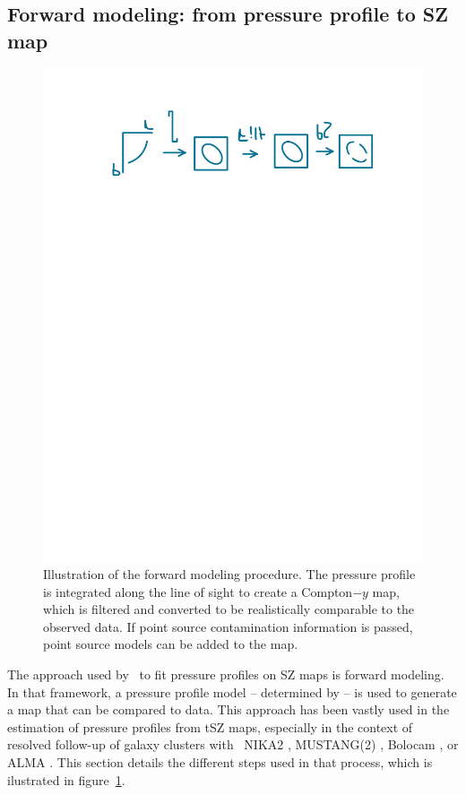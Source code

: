 \subsection{Forward modeling: from pressure profile to SZ map} \label{sec:algo:fwdmod}

\begin{figure}
    \centering
    \includegraphics[width=.9\linewidth]{Figures/fwdmod_placeholder.pdf}
    \caption{
        Illustration of the forward modeling procedure.
        The pressure profile is integrated along the line of sight to create a Compton$-y$ map, which is filtered and converted to be realistically comparable to the observed data.
        If point source contamination information is passed, point source models can be added to the map.
    }
    \label{fig:fwmod}
\end{figure}

The approach used by \panco\ to fit pressure profiles on SZ maps is forward modeling.
In that framework, a pressure profile model -- determined by  -- is used to generate a map that can be compared to data.
This approach has been vastly used in the estimation of pressure profiles from tSZ maps, especially in the context of resolved follow-up of galaxy clusters with \eg\ NIKA2 \citep[\eg][]{munoz-echeverria_multi-probe_2022,keruzore_exploiting_2020}, MUSTANG(2) \citep[\eg][]{romero_galaxy_2017,romero_pressure_2020}, Bolocam \citep[\eg][]{sayers_evolution_2022}, or ALMA \citep[\eg][]{di_mascolo_joint_2019}.
This section details the different steps used in that process, which is ilustrated in figure~\ref{fig:fwmod}.

